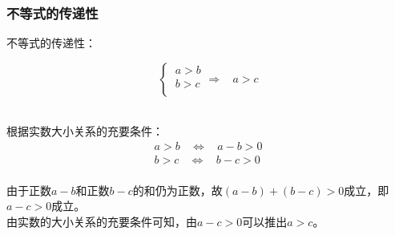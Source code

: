 \documentclass[UTF8]{ctexart}
\begin{document}
\subsubsection{不等式的传递性}
    \setcounter{equation}{0}
    不等式的传递性：
    \begin{large}
        \begin{equation*}
            \begin{cases}
                ~a>b\\[1mm]
                ~b>c\\
            \end{cases}\Longrightarrow~~~~a>c
        \end{equation*}
    \end{large}\\
    根据实数大小关系的充要条件：
    \begin{align}
        a>b~~~~\Longleftrightarrow~~~~a-b>0\\[3mm]
        b>c~~~~\Longleftrightarrow~~~~b-c>0
    \end{align}\\
    由于正数$a-b$和正数$b-c$的和仍为正数，故$(a-b)+(b-c)>0$成立，即$a-c>0$成立。\\[3mm]
    由实数的大小关系的充要条件可知，由$a-c>0$可以推出$a>c$。

\newpage
\end{document}
